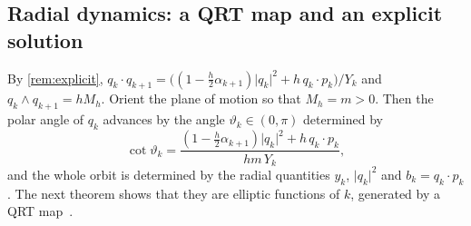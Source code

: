 \documentclass[11pt,a4paper]{article}
\theoremstyle{definition}
\theoremstyle{remark}
\begin{document}
\subsection{Radial dynamics: a QRT map and an explicit solution}\label{sec:radial}

By \cref{rem:explicit}, $q_k\cdot q_{k+1}=\big((1-\frac h2\alpha_{k+1})\lvert q_k\rvert^2+h\,q_k\cdot p_k\big)/Y_k$ and
$q_k\wedge q_{k+1}=hM_h$. Orient the plane of motion so that $M_h=m>0$. Then the polar angle of $q_k$ advances
by the angle $\vartheta_k\in(0,\pi)$ determined by
\begin{equation}\label{eq:angle}
\cot\vartheta_k=\frac{(1-\frac h2\alpha_{k+1})\lvert q_k\rvert^2+h\,q_k\cdot p_k}{hm\,Y_k},
\end{equation}
and the whole orbit is determined by the radial quantities $y_k$, $\lvert q_k\rvert^2$ and $b_k=q_k\cdot p_k$. The
next theorem shows that they are elliptic functions of $k$, generated by a QRT map~\cite{QRT88,QRT89,Duistermaat10}.
\end{document}
